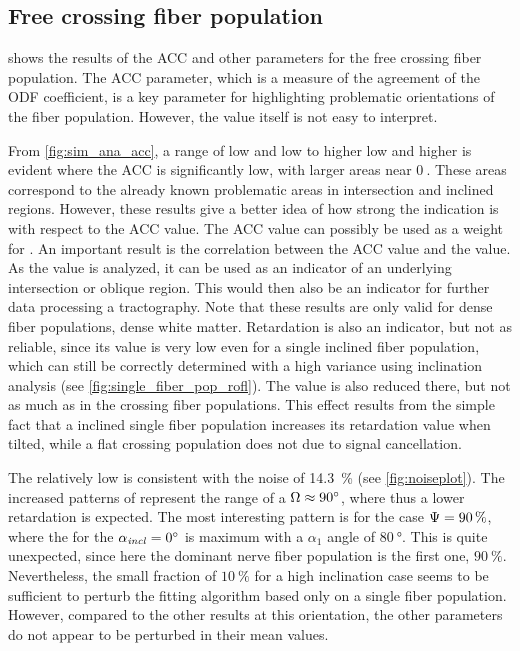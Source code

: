 \subsection{Free crossing fiber population}
 shows the results of the \ac{ACC} and other parameters for the free crossing fiber population.
The \ac{ACC} parameter, which is a measure of the agreement of the \ac{ODF} coefficient, is a key parameter for highlighting problematic orientations of the fiber population.
However, the value itself is not easy to interpret.
\par
%
From \ref{fig:sim_ana_acc}, a range of low \modelPsi{} and low \modelInc{} to higher low \modelPsi{} and higher \modelInc{} is evident where the \ac{ACC} is significantly low, with larger areas near $\SI{0}{}$.
These areas correspond to the already known problematic areas in intersection and inclined regions.
However, these results give a better idea of how strong the indication is with respect to the \ac{ACC} value.
The \ac{ACC} value can possibly be used as a weight for .
An important result is the correlation between the \ac{ACC} value and the \trel{} value.
As the \trel{} value is analyzed, it can be used as an indicator of an underlying intersection or oblique region.
This would then also be an indicator for further data processing \eg{} a tractography.
Note that these results are only valid for dense fiber populations, \ie{} dense white matter.
%
Retardation is also an indicator, but not as reliable, since its value is very low even for a single inclined fiber population, which can still be correctly determined with a high variance using inclination analysis (see \cref{fig:single_fiber_pop_rofl}).
The \trel{} value is also reduced there, but not as much as in the crossing fiber populations.
This effect results from the simple fact that a inclined single fiber population increases its retardation value when tilted, while a flat crossing population does not due to signal cancellation.
\par
%
The relatively low \rvalue{} is consistent with the noise of \SI{14.3}{\percent} (see \cref{fig:noiseplot}).
The increased patterns of \rvalue{} represent the range of a $\textnormal{$\Omega$} \approx \SI{90}{\degree}$, where thus a lower retardation is expected.
The most interesting pattern is for the case $\textnormal{$\Psi$} = \SI{90}{\percent}$, where the \rvalue{} for the $\textnormal{$\alpha_{\mathit{incl}}$} = \SI{0}{\degree}$ is maximum with a $\alpha_1$  angle of $\SI{80}{\degree}$.
This is quite unexpected, since here the dominant nerve fiber population is the first one, \ie{} $\SI{90}{\percent}$.
Nevertheless, the small fraction of $\SI{10}{\percent}$ for a high inclination case seems to be sufficient to perturb the fitting algorithm based only on a single fiber population.
However, compared to the other results at this orientation, the other parameters do not appear to be perturbed in their mean values.
%
%
%

